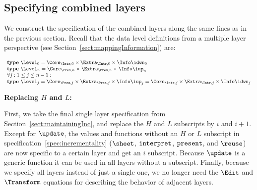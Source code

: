\subsection{Specifying combined layers}

We construct the specification of the combined layers along the same lines as in the previous section. Recall that the data level definitions from a multiple layer perspective (see Section~\ref{sect:mappingInformation}) are:

\begin{small}\( \begin{array}{lcl}  \label{inv:incrementality}
\text{\bf type}~\Level_{0}  =  \Core_{\Intr,0} \times \Extra_{\Intr,0} \times \Info\idwn_{0} \\
\text{\bf type}~\Level_{n}  =  \Core_{\Pres,n} \times \Extra_{\Pres,n} \times  \Info\iup_{n}\\
\lefteqn{\forall j:1 \le j \le n-1:}  \\
\text{\bf type}~\Level_{j} =  \Core_{\Pres,j} \times \Extra_{\Pres,j}  \times \Info\iup_{j}   
                                       =  \Core_{\Intr,j} \times \Extra_{\Intr,j} \times \Info\idwn_{j}
\end{array}\)\end{small}

\bigskip
{\bf Replacing $H$ and $L$:}

First, we take the  final single layer specification from Section~\ref{sect:maintainingInc}, and replace the $H$ and $L$ subscripts by $i$ and $i+1$. Except for $\update$, the values and functions without an $H$ or $L$ subscript in specification~\ref{spec:incrementality} ($\sheet$, ${\tt interpret}$, ${\tt present}$, and
 $\reuse$) are now specific to a certain layer and get an $i$ subscript. Because $\update$ is a generic function it can be used in all layers without a subscript. Finally, because we specify all layers instead of just a single one, we no longer need the $\Edit$ and $\Transform$ equations for describing the behavior of adjacent layers.

